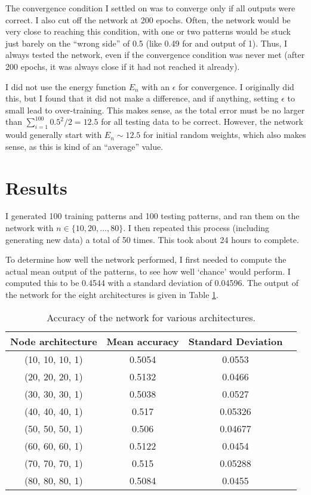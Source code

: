 \documentclass[12pt]{article}
\begin{document}
The convergence condition I settled on was to converge only if all outputs were correct.  I also cut off the network at 200 epochs.  Often, the network would be very close to reaching this condition, with one or two patterns would be stuck just barely on the ``wrong side'' of 0.5 (like 0.49 for and output of 1).  Thus, I always tested the network, even if the convergence condition was never met (after 200 epochs, it was always close if it had not reached it already).

I did not use the energy function $E_n$ with an $\epsilon$ for convergence.  I originally did this, but I found that it did not make a difference, and if anything, setting $\epsilon$ to small lead to over-training.  This makes sense, as the total error must be no larger than $\sum_{i=1}^{100}{0.5^2}/2=12.5$ for all testing data to be correct.  However, the network would generally start with $E_n \sim 12.5$ for initial random weights, which also makes sense, as this is kind of an ``average'' value.

\section{Results}
I generated 100 training patterns and 100 testing patterns, and ran them on the network with $n\in\{10, 20, \ldots, 80\}$.  I then repeated this process (including generating new data) a total of 50 times. This took about 24 hours to complete.

To determine how well the network performed, I first needed to compute the actual mean output of the patterns, to see how well `chance' would perform.  I computed this to be 0.4544 with a standard deviation of 0.04596.  The output of the network for the eight architectures is given in Table \ref{Accuracy-Table}.
\begin{table}[h]
    \begin{center}
    \begin{tabular}{|c|c|c|c|}
        \hline
        Node architecture & Mean accuracy & Standard Deviation \\
        \hline
        (10, 10, 10, 1) & 0.5054 &  0.0553\\
        \hline
        (20, 20, 20, 1) & 0.5132 &  0.0466\\
        \hline
        (30, 30, 30, 1) & 0.5038 &  0.0527\\
        \hline
        (40, 40, 40, 1) & 0.517  & 0.05326\\
        \hline
        (50, 50, 50, 1) & 0.506  & 0.04677\\
        \hline
        (60, 60, 60, 1) & 0.5122 &  0.0454\\
        \hline
        (70, 70, 70, 1) & 0.515  & 0.05288\\
        \hline
        (80, 80, 80, 1) & 0.5084 &  0.0455\\
        \hline
    \end{tabular}
    \end{center}
    \caption{Accuracy of the network for various architectures.}
    \label{Accuracy-Table}
\end{table}
\end{document}
